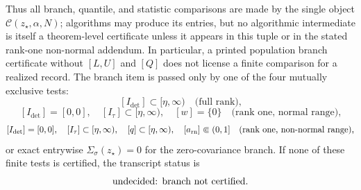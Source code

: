 \begin{algorithmiclemma}
Thus all branch, quantile, and statistic comparisons are made by the single
object \(\mathcal C(z_\star,\alpha,N)\); algorithms may produce its entries,
but no algorithmic intermediate is itself a theorem-level certificate unless
it appears in this tuple or in the stated rank-one non-normal addendum.  In
particular, a printed population branch certificate without \([L,U]\) and
\([Q]\) does not license a finite comparison for a realized record.  The branch
item is passed only by one of the four mutually exclusive tests:
\[
[I_{\det}]\subset[\eta,\infty)\quad\text{(full rank),}
\]
\[
[I_{\det}]=[0,0],\quad [I_\tau]\subset[\eta,\infty),\quad
[w]=\{0\}
\quad\text{(rank one, normal range),}
\]
\[
[I_{\det}]=[0,0],\quad [I_\tau]\subset[\eta,\infty),\quad
[q]\subset[\eta,\infty),\quad [a_{\rm rn}]\Subset(0,1]
\quad\text{(rank one, non-normal range),}
\]
or exact entrywise \(\Sigma_\sigma(z_\star)=0\) for the zero-covariance
branch.  If none of these finite tests is certified, the transcript status is
\[
\text{\rm undecided: branch not certified}.
\]


\end{algorithmiclemma}
